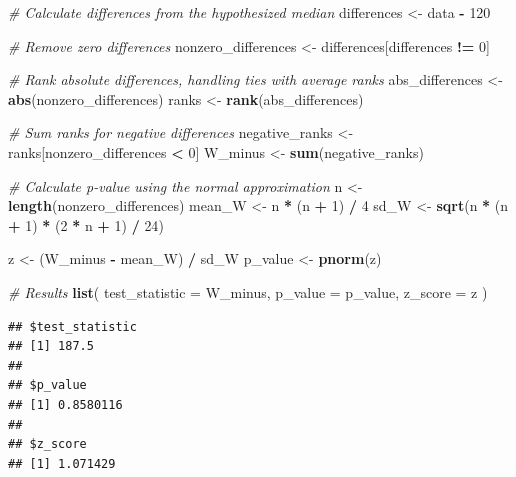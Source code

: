 \documentclass[
]{article}
\newenvironment{Shaded}{\begin{snugshade}}{\end{snugshade}}
\newcommand{\AttributeTok}[1]{\textcolor[rgb]{0.13,0.29,0.53}{#1}}
\newcommand{\CommentTok}[1]{\textcolor[rgb]{0.56,0.35,0.01}{\textit{#1}}}
\newcommand{\DecValTok}[1]{\textcolor[rgb]{0.00,0.00,0.81}{#1}}
\newcommand{\FunctionTok}[1]{\textcolor[rgb]{0.13,0.29,0.53}{\textbf{#1}}}
\newcommand{\NormalTok}[1]{#1}
\newcommand{\OtherTok}[1]{\textcolor[rgb]{0.56,0.35,0.01}{#1}}
\newcommand{\SpecialCharTok}[1]{\textcolor[rgb]{0.81,0.36,0.00}{\textbf{#1}}}
\begin{document}
\begin{Shaded}
\begin{Highlighting}[]
\CommentTok{\# Calculate differences from the hypothesized median}
\NormalTok{differences }\OtherTok{\textless{}{-}}\NormalTok{ data }\SpecialCharTok{{-}} \DecValTok{120}

\CommentTok{\# Remove zero differences}
\NormalTok{nonzero\_differences }\OtherTok{\textless{}{-}}\NormalTok{ differences[differences }\SpecialCharTok{!=} \DecValTok{0}\NormalTok{]}

\CommentTok{\# Rank absolute differences, handling ties with average ranks}
\NormalTok{abs\_differences }\OtherTok{\textless{}{-}} \FunctionTok{abs}\NormalTok{(nonzero\_differences)}
\NormalTok{ranks }\OtherTok{\textless{}{-}} \FunctionTok{rank}\NormalTok{(abs\_differences)}

\CommentTok{\# Sum ranks for negative differences}
\NormalTok{negative\_ranks }\OtherTok{\textless{}{-}}\NormalTok{ ranks[nonzero\_differences }\SpecialCharTok{\textless{}} \DecValTok{0}\NormalTok{]}
\NormalTok{W\_minus }\OtherTok{\textless{}{-}} \FunctionTok{sum}\NormalTok{(negative\_ranks)}

\CommentTok{\# Calculate p{-}value using the normal approximation}
\NormalTok{n }\OtherTok{\textless{}{-}} \FunctionTok{length}\NormalTok{(nonzero\_differences)}
\NormalTok{mean\_W }\OtherTok{\textless{}{-}}\NormalTok{ n }\SpecialCharTok{*}\NormalTok{ (n }\SpecialCharTok{+} \DecValTok{1}\NormalTok{) }\SpecialCharTok{/} \DecValTok{4}
\NormalTok{sd\_W }\OtherTok{\textless{}{-}} \FunctionTok{sqrt}\NormalTok{(n }\SpecialCharTok{*}\NormalTok{ (n }\SpecialCharTok{+} \DecValTok{1}\NormalTok{) }\SpecialCharTok{*}\NormalTok{ (}\DecValTok{2} \SpecialCharTok{*}\NormalTok{ n }\SpecialCharTok{+} \DecValTok{1}\NormalTok{) }\SpecialCharTok{/} \DecValTok{24}\NormalTok{)}

\NormalTok{z }\OtherTok{\textless{}{-}}\NormalTok{ (W\_minus }\SpecialCharTok{{-}}\NormalTok{ mean\_W) }\SpecialCharTok{/}\NormalTok{ sd\_W}
\NormalTok{p\_value }\OtherTok{\textless{}{-}} \FunctionTok{pnorm}\NormalTok{(z)}

\CommentTok{\# Results}
\FunctionTok{list}\NormalTok{(}
  \AttributeTok{test\_statistic =}\NormalTok{ W\_minus,}
  \AttributeTok{p\_value =}\NormalTok{ p\_value,}
  \AttributeTok{z\_score =}\NormalTok{ z}
\NormalTok{)}
\end{Highlighting}
\end{Shaded}

\begin{verbatim}
## $test_statistic
## [1] 187.5
## 
## $p_value
## [1] 0.8580116
## 
## $z_score
## [1] 1.071429
\end{verbatim}
\end{document}
